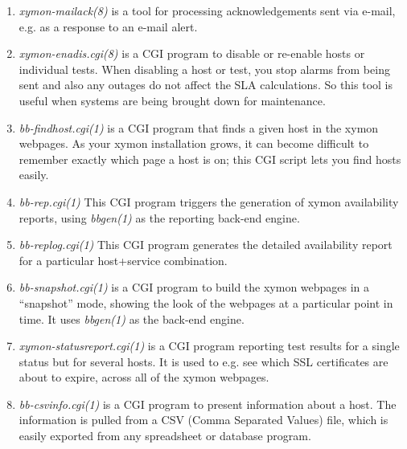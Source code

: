 \begin{enumerate}
 \item \emph{xymon-mailack(8)}
 is a tool for processing acknowledgements sent via e-mail, e.g. as a response to an e-mail alert. 


 \item \emph{xymon-enadis.cgi(8)}
 is a CGI program to disable or re-enable hosts or individual
 tests. When disabling a host or test, you stop alarms from being sent
 and also any outages do not affect the SLA calculations. So this tool
 is useful when systems are being brought down for maintenance. 



 \item \emph{bb-findhost.cgi(1)}
 is a CGI program that finds a given host in the xymon webpages. As
 your xymon installation grows, it can become difficult to remember
 exactly which page a host is on; this CGI script lets you find hosts
 easily. 



 \item \emph{bb-rep.cgi(1)} This CGI program triggers the generation of xymon availability reports, using \emph{bbgen(1)}
 as the reporting back-end engine. 


 \item \emph{bb-replog.cgi(1)} This CGI program generates the detailed availability report for a particular host+service combination. 


 \item \emph{bb-snapshot.cgi(1)} is a CGI program to build the xymon
 webpages in a ``snapshot'' mode, showing the look of the webpages at
 a particular point in time. It uses \emph{bbgen(1)} as the back-end
 engine. 



 \item \emph{xymon-statusreport.cgi(1)} is a CGI program reporting test
 results for a single status but for several hosts. It is used to
 e.g. see which SSL certificates are about to expire, across all of
 the xymon webpages. 



 \item \emph{bb-csvinfo.cgi(1)}
 is a CGI program to present information about a host. The information
 is pulled from a CSV (Comma Separated Values) file, which is easily
 exported from any spreadsheet or database program. 

\end{enumerate}

 
 
